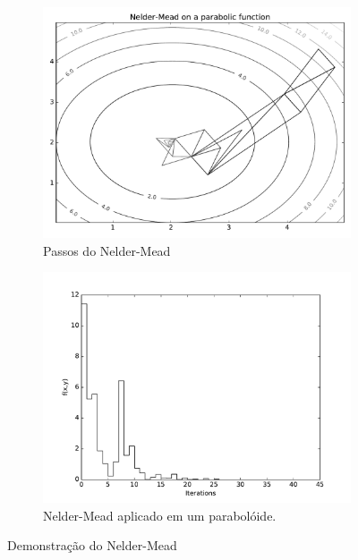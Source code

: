\begin{figure}
\centering
\begin{subfigure}{.5\textwidth}
  \centering
  \includegraphics[width=\linewidth]{figs/neldermeadsimplex.pdf}
  \caption{Passos do Nelder-Mead}
  \label{fig:sub1}
\end{subfigure}%
\begin{subfigure}{.5\textwidth}
  \centering
  \includegraphics[width=\linewidth]{figs/neldermeadconvergence.pdf}
  \caption{Nelder-Mead aplicado em um parabolóide.}
  \label{fig:sub2}
\end{subfigure}
\caption{Demonstração do Nelder-Mead}
\label{fig:neldermead}
\end{figure}




